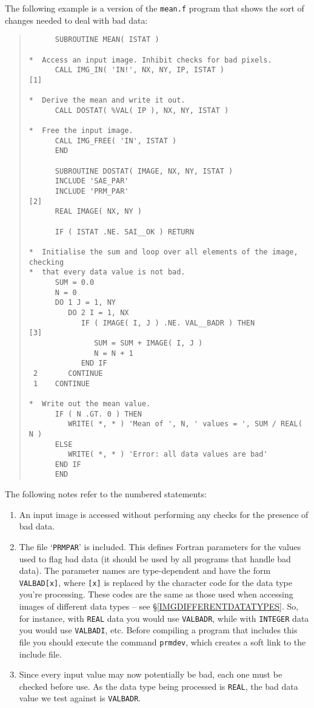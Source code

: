 \documentclass[twoside,11pt]{article}
\newcommand{\hyperref}[4]{#2\ref{#4}#3}
\newcommand{\htmlref}[2]{#1}
\renewcommand{\_}{\texttt{\symbol{95}}}
\newcommand{\myverb}[1]{{\texttt{#1}}}
\newcommand{\mynote}{The following notes refer to the numbered statements:}
\newenvironment{code}{\begin{small} \begin{quote}}
                     {\end{quote} \end{small}}
\newenvironment{enumnotes}
{
   \renewcommand{\labelenumi}{\myverb{[\theenumi]}}
   \begin{enumerate}
}{
   \end{enumerate}
   \renewcommand{\labelenumi}{\theenumi}
}
\renewenvironment{enumnotes}
  {
    \begin{enumerate}
  }{
    \end{enumerate}
  }
\begin{document}
The following example is a version of the
\htmlref{\myverb{mean.f}}{IMGMEAN} program  that shows the sort of changes needed to deal with
bad data:
\begin{code}
\begin{verbatim}
      SUBROUTINE MEAN( ISTAT )

*  Access an input image. Inhibit checks for bad pixels.
      CALL IMG_IN( 'IN!', NX, NY, IP, ISTAT )                 [1]

*  Derive the mean and write it out.
      CALL DOSTAT( %VAL( IP ), NX, NY, ISTAT )

*  Free the input image.
      CALL IMG_FREE( 'IN', ISTAT )
      END

      SUBROUTINE DOSTAT( IMAGE, NX, NY, ISTAT )
      INCLUDE 'SAE_PAR'
      INCLUDE 'PRM_PAR'                                       [2]
      REAL IMAGE( NX, NY )

      IF ( ISTAT .NE. SAI__OK ) RETURN

*  Initialise the sum and loop over all elements of the image, checking
*  that every data value is not bad.
      SUM = 0.0
      N = 0
      DO 1 J = 1, NY
         DO 2 I = 1, NX
            IF ( IMAGE( I, J ) .NE. VAL__BADR ) THEN          [3]
               SUM = SUM + IMAGE( I, J )
               N = N + 1
            END IF
 2       CONTINUE
 1    CONTINUE

*  Write out the mean value.
      IF ( N .GT. 0 ) THEN
         WRITE( *, * ) 'Mean of ', N, ' values = ', SUM / REAL( N )
      ELSE
         WRITE( *, * ) 'Error: all data values are bad'
      END IF
      END
\end{verbatim}
\end{code}
\mynote
\begin{enumnotes}
\item
An input image is accessed without performing any checks for the
presence of bad data.

\item
The file `\myverb{PRM\_PAR}' is included. This defines Fortran
parameters for the values used to flag bad data (it should be used by
all programs that handle bad data). The parameter names are
type-dependent and have the form \myverb{VAL\_\_BAD[x]}, where
\myverb{[x]} is replaced by the character code for the data type
you're processing. These codes are the same as those used when
accessing images of different data types -- see
\hyperref{here}{\S}{}{IMGDIFFERENTDATATYPES}.  So, for instance, with
\myverb{REAL} data you would use \myverb{VAL\_\_BADR}, while with
\myverb{INTEGER} data you would use \myverb{VAL\_\_BADI}, etc. Before
compiling a program that includes this file you should execute the
command \myverb{prm\_dev}, which creates a soft link to the include
file.

\item
Since every input value may now potentially be bad, each one must be
checked before use. As the data type being processed is \myverb{REAL},
the bad data value we test against is \myverb{VAL\_\_BADR}.
\end{enumnotes}
\end{document}
